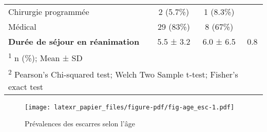 \documentclass[
  a4paper,
  fontsize=10pt]{scrartcl}
\begin{document}
\begin{table}[H]
{\begin{tabular}{lccc}
\hspace{1em}Chirurgie programmée & 2 (5.7\%) & 1 (8.3\%) & \\
\hspace{1em}Médical & 29 (83\%) & 8 (67\%) & \\
\addlinespace
\textbf{Durée de séjour en réanimation} & 5.5 ± 3.2 & 6.0 ± 6.5 & 0.8\\
\bottomrule
\multicolumn{4}{l}{\rule{0pt}{1em}\textsuperscript{1} n (\%); Mean ± SD}\\
\multicolumn{4}{l}{\rule{0pt}{1em}\textsuperscript{2} Pearson's Chi-squared test; Welch Two Sample t-test; Fisher's exact test}\\
\end{tabular}}
\end{table}

\begin{figure}

{\centering \texttt{[image: latexr\_papier\_files/figure-pdf/fig-age\_esc-1.pdf]}

}

\caption{\label{fig-age_esc}Prévalences des escarres selon l'âge}

\end{figure}
\end{document}
